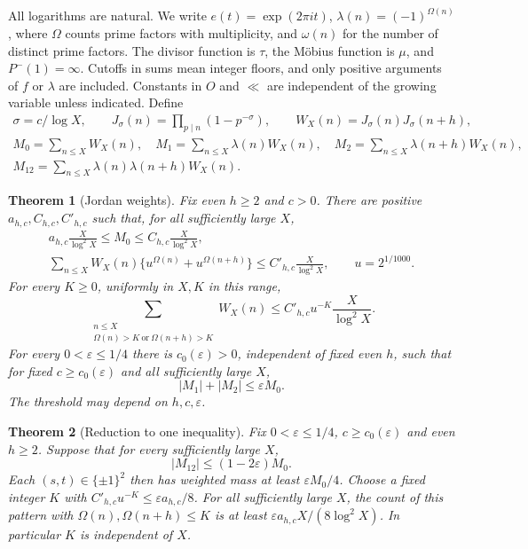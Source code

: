\documentclass[11pt]{article}
\newtheorem{theorem}{Theorem}[section]
\theoremstyle{definition}
\theoremstyle{remark}
\numberwithin{equation}{section}
\begin{document}
All logarithms are natural. We write $e(t)=\exp(2\pi it)$,
$\lambda(n)=(-1)^{\Omega(n)}$, where $\Omega$ counts prime factors with multiplicity, and
$\omega(n)$ for the number of distinct prime factors. The divisor function is $\tau$, the M\"obius function
is $\mu$, and $P^-(1)=\infty$. Cutoffs in sums mean integer floors, and only positive arguments of $f$ or
$\lambda$ are included. Constants in $O$ and $\ll$ are independent of the growing variable unless indicated.
Define
\begin{equation}\label{eq:j-def}
\begin{gathered}
 \sigma=c/\log X,\qquad J_\sigma(n)=\prod_{p\mid n}(1-p^{-\sigma}),\qquad
 W_X(n)=J_\sigma(n)J_\sigma(n+h),\\
 M_0=\sum_{n\le X}W_X(n),\quad M_1=\sum_{n\le X}\lambda(n)W_X(n),\quad
 M_2=\sum_{n\le X}\lambda(n+h)W_X(n),\\
 M_{12}=\sum_{n\le X}\lambda(n)\lambda(n+h)W_X(n).
\end{gathered}
\end{equation}
\begin{theorem}[Jordan weights]\label{thm:jordan}
Fix even $h\ge2$ and $c>0$. There are positive $a_{h,c},C_{h,c},C'_{h,c}$ such that, for all sufficiently
large $X$,
\begin{equation}\label{eq:j-mass}
\begin{gathered}
 a_{h,c}\frac X{\log^2X}\le M_0\le C_{h,c}\frac X{\log^2X},\\
 \sum_{n\le X}W_X(n)\{u^{\Omega(n)}+u^{\Omega(n+h)}\}\le C'_{h,c}\frac X{\log^2X},
 \qquad u=2^{1/1000}.
\end{gathered}
\end{equation}
For every $K\ge0$, uniformly in $X,K$ in this range,
\begin{equation}\label{eq:j-tail}
 \sum_{\substack{n\le X\\\Omega(n)>K\ \text{or}\ \Omega(n+h)>K}}W_X(n)
 \le C'_{h,c}u^{-K}\frac X{\log^2X}.
\end{equation}
For every $0<\varepsilon\le1/4$ there is $c_0(\varepsilon)>0$, independent of fixed even $h$, such that
for fixed $c\ge c_0(\varepsilon)$ and all sufficiently large $X$,
\begin{equation}\label{eq:j-single}
 |M_1|+|M_2|\le\varepsilon M_0.
\end{equation}
The threshold may depend on $h,c,\varepsilon$.
\end{theorem}
\begin{theorem}[Reduction to one inequality]\label{thm:reduction}
Fix $0<\varepsilon\le1/4$, $c\ge c_0(\varepsilon)$ and even $h\ge2$.
Suppose that for every sufficiently large $X$,
\begin{equation}\label{eq:j-joint}
 |M_{12}|\le(1-2\varepsilon)M_0.
\end{equation}
Each $(s,t)\in\{\pm1\}^2$ then has weighted mass at least $\varepsilon M_0/4$.
Choose a fixed integer $K$ with $C'_{h,c}u^{-K}\le\varepsilon a_{h,c}/8$.
For all sufficiently large $X$, the count of this pattern with
$\Omega(n),\Omega(n+h)\le K$ is at least $\varepsilon a_{h,c}X/(8\log^2X)$.
In particular $K$ is independent of $X$.
\end{theorem}
\end{document}
